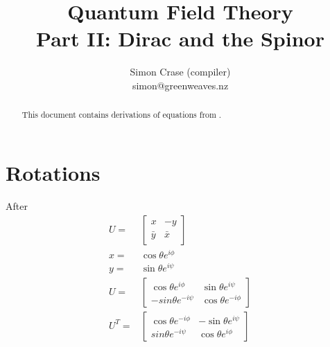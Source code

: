 \documentclass[]{article}
\title{Quantum Field Theory\\
Part II: Dirac and the Spinor}
\author{Simon Crase (compiler)\\simon@greenweaves.nz}
\begin{document}
\maketitle

\begin{abstract}

This document contains derivations of equations from \cite[Part II: Dirac and the Spinor]{zee2010quantum}.

\end{abstract}

\tableofcontents
\section{Rotations}
After \cite{westra2008SU2}
\begin{align*}
	U =& \begin{bmatrix}
		x&-y\\
		\bar{y}&\bar{x}
	\end{bmatrix}\\
	x =& \cos{\theta} e^{i\phi}\\
	y =& \sin{\theta} e^{i\psi}\\
	U=& \begin{bmatrix}
		\cos{\theta} e^{i\phi}&\sin{\theta}e^{i\psi}\\
		-sin{\theta}e^{-i\psi}&\cos{\theta} e^{-i\phi}
	\end{bmatrix}\\
	U^T =& \begin{bmatrix}
		\cos{\theta} e^{-i\phi}&-\sin{\theta}e^{i\psi}\\
		sin{\theta}e^{-i\psi}&\cos{\theta} e^{i\phi}
	\end{bmatrix}
\end{align*}
\end{document}
